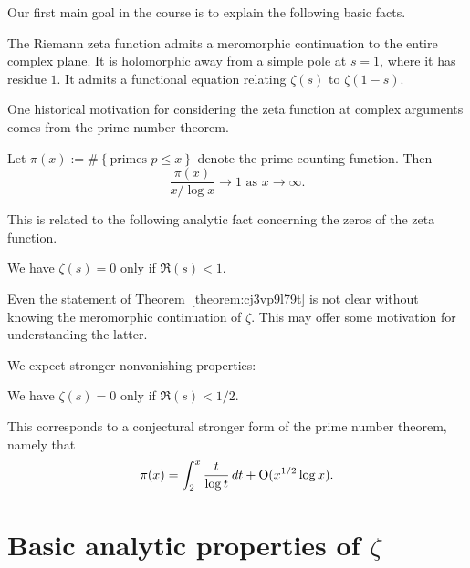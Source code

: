 \documentclass[reqno]{amsart}  \numberwithin{theorem}{section} \numberwithin{equation}{section}
\begin{document}
Our first main goal in the course is to explain the following basic facts.
\begin{theorem}
  The Riemann zeta function admits a meromorphic continuation to the entire complex plane.  It is holomorphic away from a simple pole at $s = 1$, where it has residue $1$.  It admits a functional equation relating $\zeta (s)$ to $\zeta (1-s)$.
\end{theorem}

One historical motivation for considering the zeta function at complex arguments comes from the prime number theorem.
\begin{theorem}
  Let $\pi(x) := \# \left\{ \text{primes } p \leq x \right\}$ denote the prime counting function.  Then
  \begin{equation*}
    \frac{\pi(x)}{x / \log x} \rightarrow 1
    \text{ as } x \rightarrow \infty.
  \end{equation*}
\end{theorem}
This is related to the following analytic fact concerning the zeros of the zeta function.
\begin{theorem}\label{theorem:cj3vp9l79t}
  We have $\zeta(s) = 0$ only if $\Re(s) < 1$.
\end{theorem}
\begin{remark}
  Even the statement of Theorem~\ref{theorem:cj3vp9l79t} is not clear without knowing the meromorphic continuation of $\zeta$.  This may offer some motivation for understanding the latter.
\end{remark}
We expect stronger nonvanishing properties:
\begin{conjecture}
  We have $\zeta(s) = 0$ only if $\Re(s) < 1/2$.
\end{conjecture}
This corresponds to a conjectural stronger form of the prime number theorem, namely that
\begin{equation*}
  \pi(x) = \int_2^x \frac{t}{\log t} \, d t
  + \operatorname{O} (x^{1/2} \log x).
\end{equation*}

\newpage

\newpage
\section{Basic analytic properties of $\zeta$}\label{sec:cj4unjziaz}
\end{document}
